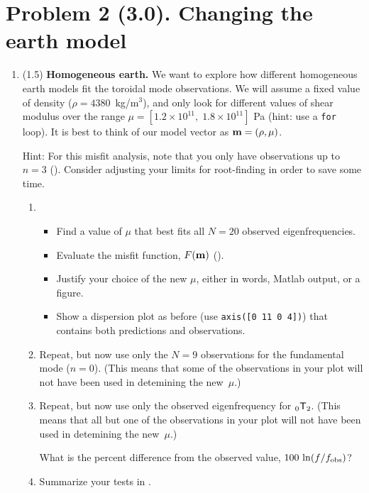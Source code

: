 \documentclass[11pt,titlepage,fleqn]{article}
\begin{document}

\section*{Problem 2 (3.0). Changing the earth model}

\begin{enumerate}
\item (1.5) {\bf Homogeneous earth.} We want to explore how different homogeneous earth models fit the toroidal mode observations. We will assume a fixed value of density ($\rho = 4380$~kg/m$^3$), and only look for different values of shear modulus over the range $\mu = [1.2\times 10^{11},\; 1.8 \times 10^{11}]$ Pa (hint: use a {\tt for} loop). It is best to think of our model vector as $\mbox{${\bf m}$} = (\rho, \mu)$.

Hint: For this misfit analysis, note that you only have observations up to $n = 3$ (). Consider adjusting your limits for root-finding in order to save some time.

\begin{enumerate}
\item 
\begin{itemize}
\item Find a value of $\mu$ that best fits all $N=20$ observed eigenfrequencies.
\item Evaluate the misfit function, $F(\mbox{${\bf m}$})$ ().
\item Justify your choice of the new $\mu$, either in words, Matlab output, or a figure.
\item Show a dispersion plot as before (use \verb+axis([0 11 0 4])+) that contains both predictions and observations.
\end{itemize}

\item Repeat, but now use only the $N = 9$ observations for the fundamental mode ($n=0$). (This means that some of the observations in your plot will not have been used in detemining the new~$\mu$.)

\item Repeat, but now use only the observed eigenfrequency for $_0\mbox{${\sf T}$}_2$. (This means that all but one of the observations in your plot will not have been used in detemining the new~$\mu$.)

What is the percent difference from the observed value, $100\,\ln(f/f_{\rm obs})$?

\item Summarize your tests in .
\end{enumerate}


\end{enumerate}
\end{document}
